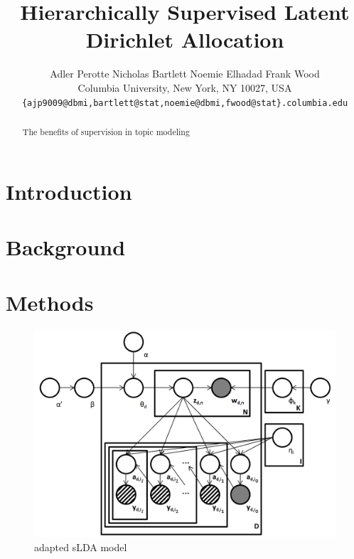 \documentclass{article}
\title{Hierarchically Supervised Latent Dirichlet Allocation}
\author{
Adler Perotte\hspace{1cm} Nicholas Bartlett \hspace{1cm} Noemie Elhadad \hspace{1cm} Frank Wood\\
Columbia University, New York, NY 10027, USA \\
\texttt{\{ajp9009@dbmi,bartlett@stat,noemie@dbmi,fwood@stat\}.columbia.edu}
}
\begin{document}
\maketitle

\begin{abstract}
The benefits of supervision in topic modeling 
\end{abstract}

\section{Introduction}

\label{sec:introduction}




\section{Background}


\section{Methods}


%
\begin{figure}[h]
 \centering \includegraphics[scale=0.3]{Graphical_Model2} \caption{adapted sLDA model}


\label{fig:example} 
\end{figure}
\end{document}

